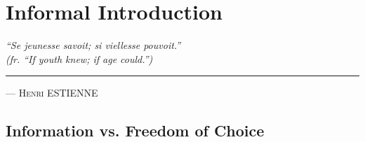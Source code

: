 \chapter{Informal Introduction}

\hfill
\begin{minipage}[t]{.75\textwidth}
\textit{``Se jeunesse savoit; si viellesse pouvoit.'' \\
  (fr. ``If youth knew; if age could.'')} \\
  \hrule
  \vspace{.2cm}
  \hfill
  \textsc{--- Henri ESTIENNE}
\end{minipage}

\section{Information vs. Freedom of Choice}

